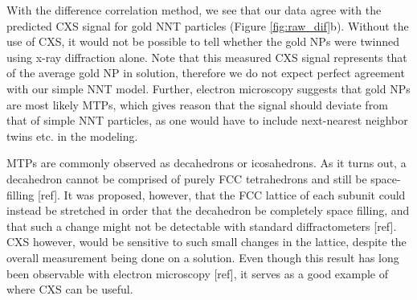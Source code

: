 \documentclass [11pt,fleqn]{article}
\def \be {\begin{equation}}
\def \ee {\end{equation}}
\begin{document}
With the difference correlation method, we see that our data agree with the predicted CXS signal for gold NNT particles (Figure \ref{fig:raw_dif}b). Without the use of CXS, it would not be possible to tell whether the gold NPs were twinned using x-ray diffraction alone. Note that this measured CXS signal represents that of the average gold NP in solution, therefore we do not expect perfect agreement with our simple NNT model. Further, electron microscopy suggests that gold NPs are most likely MTPs, which gives reason that the signal should deviate from that of simple NNT particles, as one would have to include next-nearest neighbor twins etc. in the modeling.

MTPs are commonly observed as decahedrons or icosahedrons. As it turns out, a decahedron cannot be comprised of purely FCC tetrahedrons and still be space-filling [ref]. It was proposed, however, that the FCC lattice of each subunit could instead be stretched in order that the decahedron be completely space filling, and that such a change might not be detectable with standard diffractometers [ref]. CXS however, would be sensitive to such small changes in the lattice, despite the overall measurement being done on a solution. Even though this result has long been observable with electron microscopy [ref], it serves as a good example of where CXS can be useful.




\end{document}
